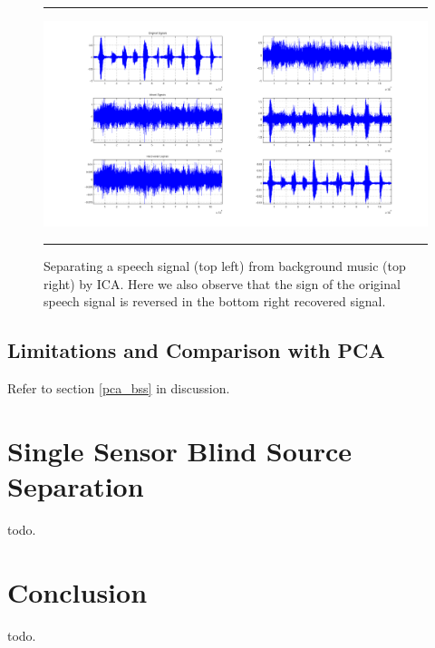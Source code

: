 \documentclass[11pt, oneside, a4paper]{report}
\begin{document}
\begin{figure}
  \centering
  \hrule
  \includegraphics[width = .9\textwidth]{Figures/ica_music_speech}
  \hrule
  \caption{Separating a speech signal (top left) from background music (top right) by ICA. Here we also observe that the sign of the original speech signal is reversed in the bottom right recovered signal. }
\end{figure}




\section{Limitations and Comparison with PCA}\label{ica_conclusions}

Refer to section \ref{pca_bss} in discussion.


\chapter{Single Sensor Blind Source Separation}\label{ssbss_chap}

todo.

\chapter{Conclusion}

todo.

\begin{thebibliography}{9}



  
\end{thebibliography}
\end{document}
